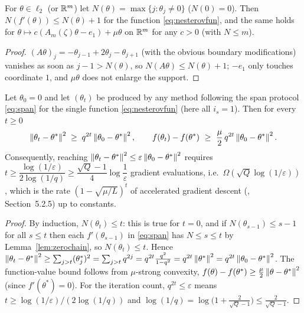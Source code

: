 \begin{lemma}
\label{lem:zerochain}
For $\theta\in\ell_2$ (or $\mathbb{R}^m$) let $N(\theta)=\max\{j:\theta_j\ne0\}$ ($N(0)=0$). Then $N(f'(\theta))\le N(\theta)+1$ for the function \eqref{eq:nesterovfun}, and the same holds for $\theta\mapsto c(A_m(\zeta)\theta-e_1)+\mu\theta$ on $\mathbb{R}^m$ for any $c>0$ (with $N\le m$).
\end{lemma}

\begin{proof}
$(A\theta)_j=-\theta_{j-1}+2\theta_j-\theta_{j+1}$ (with the obvious boundary modifications) vanishes as soon as $j-1>N(\theta)$, so $N(A\theta)\le N(\theta)+1$; $-e_1$ only touches coordinate $1$, and $\mu\theta$ does not enlarge the support.
\end{proof}

\begin{theorem}
\label{thm:nesterov}
Let $\theta_0=0$ and let $(\theta_t)$ be produced by any method following the span protocol \eqref{eq:span} for the single function \eqref{eq:nesterovfun} (here all $i_s=1$). Then for every $t\ge0$
\begin{equation}
\label{ineq:nesterov}
\norm{\theta_t-\theta^\ast}^2\;\ge\;q^{2t}\norm{\theta_0-\theta^\ast}^2,\qquad f(\theta_t)-f(\theta^\ast)\ \ge\ \frac\mu2\,q^{2t}\norm{\theta_0-\theta^\ast}^2 .
\end{equation}
Consequently, reaching $\left\|\theta_t-\theta^\ast\right\|^2\le\varepsilon\left\|\theta_0-\theta^\ast\right\|^2$ requires $t\ge\dfrac{\log(1/\varepsilon)}{2\log(1/q)}\ge\dfrac{\sqrt Q-1}{4}\log\dfrac1\varepsilon$ gradient evaluations, i.e.\ $\Omega(\sqrt{Q}\log(1/\varepsilon))$, which is the rate $(1-\sqrt{\mu/L})^t$ of accelerated gradient descent (\cite{bach2024learning}, Section~5.2.5) up to constants.
\end{theorem}

\begin{proof}
By induction, $N(\theta_t)\le t$: this is true for $t=0$, and if $N(\theta_{s-1})\le s-1$ for all $s\le t$ then each $f'(\theta_{s-1})$ in \eqref{eq:span} has $N\le s\le t$ by Lemma~\ref{lem:zerochain}, so $N(\theta_t)\le t$. Hence $\left\|\theta_t-\theta^\ast\right\|^2\ge\sum_{j>t}(\theta^\ast_j)^2=\sum_{j>t}q^{2j}=q^{2t}\frac{q^2}{1-q^2}=q^{2t}\left\|\theta^\ast\right\|^2=q^{2t}\left\|\theta_0-\theta^\ast\right\|^2$. The function-value bound follows from $\mu$-strong convexity, $f(\theta)-f(\theta^\ast)\ge\frac\mu2\left\|\theta-\theta^\ast\right\|^2$ (since $f'(\theta^\ast)=0$). For the iteration count, $q^{2t}\le\varepsilon$ means $t\ge\log(1/\varepsilon)/(2\log(1/q))$ and $\log(1/q)=\log\big(1+\frac{2}{\sqrt Q-1}\big)\le\frac{2}{\sqrt Q-1}$.
\end{proof}

